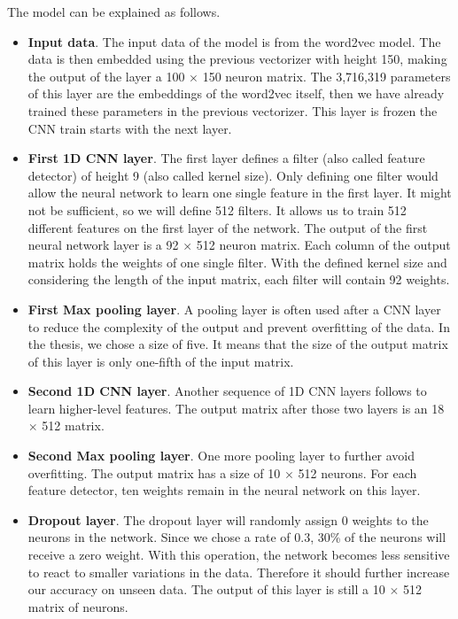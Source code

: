 The model can be explained as follows.
\begin{itemize}
	\item \textbf{Input data}. The input data of the model is from the word2vec model. The data is then embedded using the previous vectorizer with height 150, making the output of the layer a 100 $\times$ 150 neuron matrix. The 3,716,319 parameters of this layer are the embeddings of the word2vec itself, then we have already trained these parameters in the previous vectorizer. This layer is frozen the CNN train starts with the next layer.
	\item \textbf{First 1D CNN layer}. The first layer defines a filter (also called feature detector) of height 9 (also called kernel size). Only defining one filter would allow the neural network to learn one single feature in the first layer. It might not be sufficient, so we will define 512 filters. It allows us to train 512 different features on the first layer of the network. The output of the first neural network layer is a 92 $\times$ 512 neuron matrix. Each column of the output matrix holds the weights of one single filter. With the defined kernel size and considering the length of the input matrix, each filter will contain 92 weights. 
	\item \textbf{First Max pooling layer}. A pooling layer is often used after a CNN layer to reduce the complexity of the output and prevent overfitting of the data. In the thesis, we chose a size of five. It means that the size of the output matrix of this layer is only one-fifth of the input matrix. 
	\item \textbf{Second 1D CNN layer}. Another sequence of 1D CNN layers follows to learn higher-level features. The output matrix after those two layers is an 18 $\times$ 512 matrix. 
	\item \textbf{Second Max pooling layer}. One more pooling layer to further avoid overfitting. The output matrix has a size of 10 $\times$ 512 neurons. For each feature detector, ten weights remain in the neural network on this layer. 
	\item \textbf{Dropout layer}. The dropout layer will randomly assign 0 weights to the neurons in the network. Since we chose a rate of 0.3, 30\% of the neurons will receive a zero weight. With this operation, the network becomes less sensitive to react to smaller variations in the data. Therefore it should further increase our accuracy on unseen data. The output of this layer is still a 10 $\times$ 512 matrix of neurons. 

\end{itemize}
